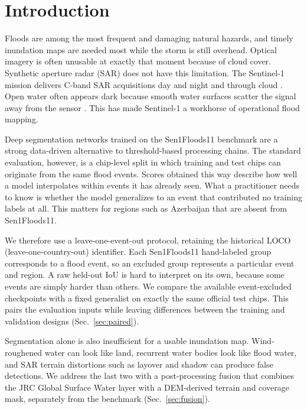 \section{Introduction}
\label{sec:intro}

Floods are among the most frequent and damaging natural hazards, and timely
inundation maps are needed most while the storm is still overhead. Optical
imagery is often unusable at exactly that moment because of cloud cover.
Synthetic aperture radar (SAR) does not have this limitation. The Sentinel-1
mission delivers C-band SAR acquisitions day and night and through cloud
\cite{torres2012}. Open water often appears dark because smooth water surfaces
scatter the signal away from the sensor \cite{twele2016sentinel1}. This has
made Sentinel-1 a workhorse of operational flood mapping.

Deep segmentation networks trained on the Sen1Floods11 benchmark
\cite{bonafilia2020} are a strong data-driven alternative to threshold-based
processing chains. The standard evaluation, however, is a chip-level split
in which training and test chips can originate from the same flood events.
Scores obtained this way describe how well a model interpolates within
events it has already seen. What a practitioner needs to know is whether
the model generalizes to an event that contributed no training labels at
all. This matters for regions such as Azerbaijan that are absent from
Sen1Floods11.

We therefore use a leave-one-event-out protocol, retaining the historical
LOCO (leave-one-country-out) identifier. Each Sen1Floods11 hand-labeled
group corresponds to a flood event, so an excluded group represents a
particular event and region. A raw held-out IoU is hard to interpret on its
own, because some events are simply harder than others. We compare the
available event-excluded checkpoints with a fixed generalist on exactly
the same official test chips. This pairs the evaluation inputs while
leaving differences between the training and validation designs
(Sec.~\ref{sec:paired}).

Segmentation alone is also insufficient for a usable inundation map.
Wind-roughened water can look like land, recurrent water bodies look like
flood water, and SAR terrain distortions such as layover and shadow can
produce false detections. We address the last two with a post-processing
fusion that combines the JRC Global Surface Water layer \cite{pekel2016high}
with a DEM-derived terrain and coverage mask, separately from the
benchmark (Sec.~\ref{sec:fusion}).

